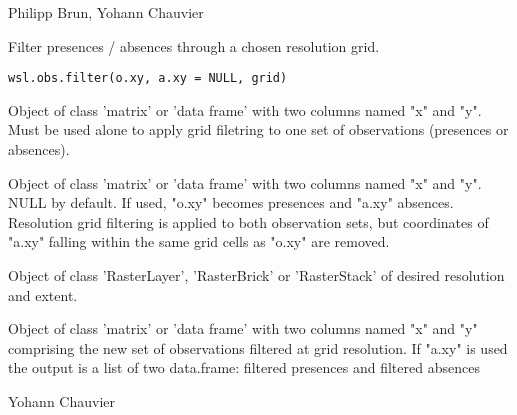 \documentclass[a4paper]{book}
\begin{document}
%
\begin{Author}\relax
Philipp Brun, Yohann Chauvier
\end{Author}
%
\begin{Description}\relax
Filter presences / absences through a chosen resolution grid.
\end{Description}
%
\begin{Usage}
\begin{verbatim}
wsl.obs.filter(o.xy, a.xy = NULL, grid)
\end{verbatim}
\end{Usage}
%
\begin{Arguments}
\begin{ldescription}
\item[\code{o.xy}] Object of class 'matrix' or 'data frame' with two columns named
"x" and "y". Must be used alone to apply grid filetring to one set of observations
(presences or absences).

\item[\code{a.xy}] Object of class 'matrix' or 'data frame' with two columns named "x" and
"y". NULL by default. If used, "o.xy" becomes presences and "a.xy" absences.
Resolution grid filtering is applied to both observation sets, but coordinates of
"a.xy" falling within the same grid cells as "o.xy" are removed.

\item[\code{grid}] Object of class 'RasterLayer', 'RasterBrick' or 'RasterStack' of
desired resolution and extent.
\end{ldescription}
\end{Arguments}
%
\begin{Value}
Object of class 'matrix' or 'data frame' with two columns named "x" and "y"
comprising the new set of observations filtered at grid resolution. If "a.xy" is
used the output is a list of two data.frame: filtered presences and filtered absences
\end{Value}
%
\begin{Author}\relax
Yohann Chauvier
\end{Author}
%
\end{document}
